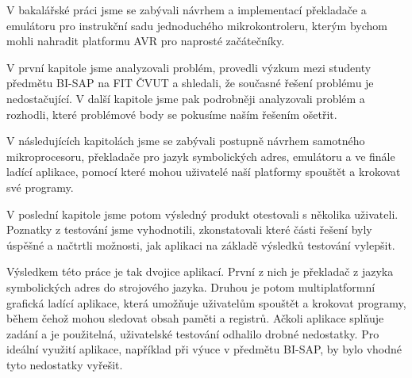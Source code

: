\begin{conclusion}

V bakalářské práci jsme se zabývali návrhem a implementací překladače a emulátoru pro instrukční sadu jednoduchého mikrokontroleru, kterým bychom mohli nahradit platformu AVR pro naprosté začátečníky.

V první kapitole jsme analyzovali problém, provedli výzkum mezi studenty předmětu BI-SAP na FIT ČVUT a shledali, že současné řešení problému je nedostačující. V další kapitole jsme pak podrobněji analyzovali problém a rozhodli, které problémové body se pokusíme naším řešením ošetřit.

V následujících kapitolách jsme se zabývali postupně návrhem samotného mikroprocesoru, překladače pro jazyk symbolických adres, emulátoru a ve finále ladící aplikace, pomocí které mohou uživatelé naší platformy spouštět a krokovat své programy.

V poslední kapitole jsme potom výsledný produkt otestovali s několika uživateli. Poznatky z testování jsme vyhodnotili, zkonstatovali které části řešení byly úspěšné a načtrtli možnosti, jak aplikaci na základě výsledků testování vylepšit.

Výsledkem této práce je tak dvojice aplikací. První z nich je překladač z jazyka symbolických adres do strojového jazyka. Druhou je potom multiplatformní grafická ladící aplikace, která umožňuje uživatelům spouštět a krokovat programy, během čehož mohou sledovat obsah paměti a registrů. Ačkoli aplikace splňuje zadání a je použitelná, uživatelské testování odhalilo drobné nedostatky. Pro ideální využití aplikace, například při výuce v předmětu BI-SAP, by bylo vhodné tyto nedostatky vyřešit.

\end{conclusion}
